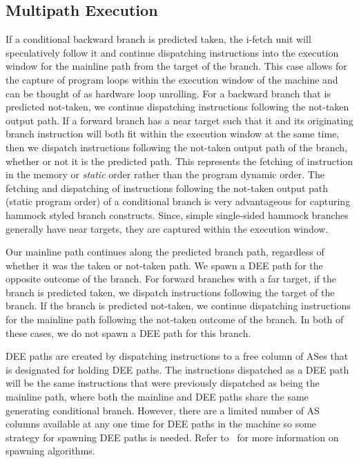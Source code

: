 \documentclass{book}
\begin{document}
\subsection{Multipath Execution}
%
If a conditional backward branch is predicted taken,
the i-fetch unit
will speculatively follow it and continue dispatching instructions
into the execution window for the mainline path from the target
of the branch.  
This case allows for the capture of program loops
within the execution window of the machine and can be thought of
as hardware loop unrolling.
For a backward branch that
is predicted not-taken, we continue dispatching instructions following the
not-taken output path.
If a forward branch has a near target such
that it and its originating branch instruction will both
fit within the execution window at the same time, 
then we dispatch instructions following the
not-taken output path of the branch, whether or not it is the predicted path.
This represents the fetching of instruction in the 
memory or {\em static} order rather than the program dynamic order.
The fetching and dispatching of instructions following the
not-taken output path (static program order) of a conditional
branch is very advantageous for 
capturing hammock styled branch constructs.  
Since, simple single-sided hammock branches generally have near targets,
they are captured within the execution window.

Our mainline path continues along the predicted branch path,
regardless of whether it was the taken or not-taken path.  
We spawn a DEE path
for the opposite outcome of the branch.
For forward branches with a far target,
if the branch is predicted taken, we dispatch instructions following the target
of the branch.  
If the branch is predicted not-taken, we continue
dispatching instructions for the mainline path following the not-taken
outcome of the branch.  In both of these cases, we do not
spawn a DEE path for this branch.

DEE paths are created by dispatching instructions to a 
free column of ASes that is designated for holding DEE paths.
The instructions dispatched as a DEE path will be the same
instructions that were previously dispatched as being the
mainline path, where both the mainline and DEE paths share the
same generating conditional branch.
However, there are a limited number of AS columns
available at any one time for DEE paths in the machine so some
strategy for spawning DEE paths is needed.
Refer to~\cite{EPAR} for more information on spawning
algorithms.
%
%
\end{document}
